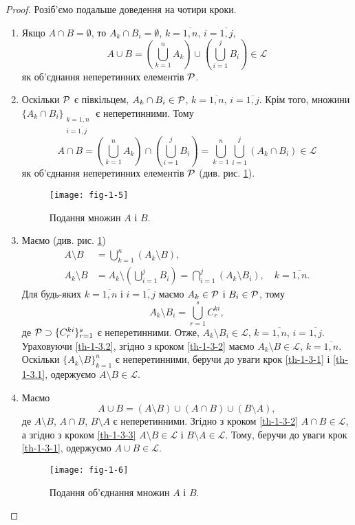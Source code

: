 \begin{proof}
Розіб'ємо подальше доведення на чотири кроки.
\begin{enumerate}[label={\slshape Крок } {\upshape\arabic*.}, ref={\upshape \arabic*}, leftmargin=0em, labelwidth=53pt, itemindent=70.37pt, labelsep=0pt, align=left]
\item \label{th-1-3-1}
Якщо $A\cap B=\emptyset$, то $A_k\cap B_i=\emptyset$, $k=\overline{1,n}$, $i=\overline{1,j}$,\the\itemindent
$$
A\cup B=\left(\bigcup_{k=1}^n A_k\right) \cup \left(\bigcup_{i=1}^j B_i\right) \in\mathcal L
$$
як об'єднання неперетинних елементів $\mathcal P$.
\item \label{th-1-3-2}
Оскільки $\mathcal P$ є півкільцем, $A_k\cap B_i\in \mathcal P$, $k=\overline{1,n}$, $i=\overline{1,j}$. Крім того, множини $\{A_k\cap B_i\}_{\substack{k=\overline{1,n}\\i=\overline{1,j} }}$   є неперетинними.  Тому
$$
A\cap B=\left(\bigcup_{k=1}^n A_k\right) \cap \left(\bigcup_{i=1}^j B_i\right) =\bigcup_{k=1}^n\bigcup_{i=1}^j (A_k\cap B_i)  \in\mathcal L
$$
як об'єднання неперетинних елементів $\mathcal P$  (див. рис. \ref{fig-1-5}).
\begin{figure}[!h]
	\centering
	\texttt{[image: fig-1-5]}
	\caption{Подання множин $A$ і $B$.}
	\label{fig-1-5}
\end{figure}
\item \label{th-1-3-3}
Маємо (див. рис. \ref{fig-1-5}) 
\begin{align}
\label{th-1-3.1}
A\setminus B&= \bigcup_{k=1}^n (A_k\setminus B),
\\
\label{th-1-3.2} 
A_k\setminus B&= A_k\setminus \left(\bigcup_{i=1}^j B_i\right)
= \bigcap_{i=1}^j (A_k\setminus B_i),\quad k=\overline{1,n}.
\end{align}
Для будь-яких $k=\overline{1,n}$ і $i=\overline{1,j}$ маємо $A_k\in \mathcal P$ і $B_i\in\mathcal P$, тому
$$
A_k\setminus B_i=\bigcup_{r=1}^{s} C_r^{ki},
$$
де $\mathcal P\supset\{C_r^{ki}\}_{r=1}^s$ є неперетинними. Отже, $A_k\setminus B_i\in\mathcal L$, $k=\overline{1,n}$, $i=\overline{1,j}$. Ураховуючи \eqref{th-1-3.2}, згідно з кроком \ref{th-1-3-2} маємо 
$A_k\setminus B\in\mathcal L$, $k=\overline{1,n}$.  Оскільки $\{A_k\setminus B\}_{k=1}^n$  є неперетинними, беручи до уваги крок \ref{th-1-3-1} і \eqref{th-1-3.1}, одержуємо $A\setminus B\in\mathcal L$.
\item \label{th-1-3-4}
Маємо
$$
A\cup B=(A\setminus B)\cup(A\cap B)\cup(B\setminus A),
$$
де $A\setminus B$, $A\cap B$, $B\setminus A$ є неперетинними. Згідно з кроком \ref{th-1-3-2}  $A\cap B\in\mathcal L$,  а згідно з кроком \ref{th-1-3-3} $A\setminus B\in\mathcal L$ і $B\setminus A\in\mathcal L$. Тому, беручи до уваги крок \ref{th-1-3-1}, одержуємо $A\cup B\in\mathcal L$. 
\begin{figure}[!h]
	\centering
	\texttt{[image: fig-1-6]}
	\caption{Подання об'єднання множин $A$ і $B$.}
	\label{fig-1-6}
\end{figure}
\end{enumerate}


\end{proof}
